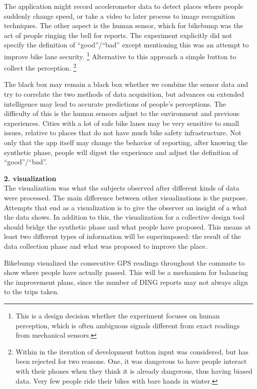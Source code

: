 The application might record accelerometer data to detect places where people suddenly change speed, or take a video to later process to image recognition techniques. The other aspect is the human sensor, which for bikebump was the act of people ringing the bell for reports. The experiment explicitly did not specify the definition of ``good''/``bad'' except mentioning this was an attempt to improve bike lane security. \footnote{This is a design decision whether the experiment focuses on human perception, which is often ambiguous signals different from exact readings from mechanical sensors.}
Alternative to this approach a simple button to collect the perception.
\footnote{Within in the iteration of development button input was considered, but has been rejected for two reasons. One, it was dangerous to have people interact with their phones when they think it is already dangerous, thus having biased data. Very few people ride their bikes with bare hands in winter.}

The black box may remain a black box whether we combine the sensor data and try to correlate the two methods of data acquisition, but advances on extended intelligence\cite{pubpub:extended} may lead to accurate predictions of people's perceptions. The difficulty of this is the human sensors adjust to the environment and previous experiences. Cities with a lot of safe bike lanes may be very sensitive to small issues, relative to places that do not have much bike safety infrastructure. Not only that the app itself may change the behavior of reporting, after knowing the synthetic phase, people will digest the experience and adjust the definition of ``good''/``bad''.

\textbf{2. visualization} \\
The visualization was what the subjects observed after different kinds of data were processed. The main difference between other visualizations is the purpose. Attempts that end as a visualization is to give the observer an insight of a what the data shows. In addition to this, the visualization for a collective design tool should bridge the synthetic phase and what people have proposed. This means at least two different types of information will be superimposed: the result of the data collection phase and what was proposed to improve the place.

Bikebump visualized the consecutive GPS readings throughout the commute to show where people have actually passed. This will be a mechanism for balancing the improvement plans, since the number of DING reports may not always align to the trips taken.


